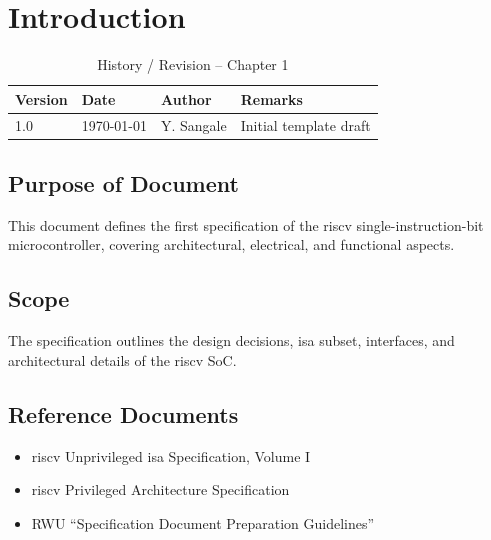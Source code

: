 
\chapter{Introduction}
\label{chap:introduction}

\begin{table}[H]
\caption{History / Revision – Chapter 1}
\label{tab:history-ch1}
\centering
\begin{tabular}{llll}
\toprule
Version & Date & Author & Remarks \\
\midrule
1.0 & \today & Y. Sangale & Initial template draft \\
\bottomrule
\end{tabular}
\end{table}

\section{Purpose of Document}
This document defines the first specification of the \gls{riscv} single-instruction-bit microcontroller, covering architectural, electrical, and functional aspects.

\section{Scope}
The specification outlines the design decisions, \gls{isa} subset, interfaces, and architectural details of the \gls{riscv} \gls{SoC}.

\section{Reference Documents}
\begin{itemize}
    \item \gls{riscv} Unprivileged \gls{isa} Specification, Volume I
    \item \gls{riscv} Privileged Architecture Specification
    \item RWU “Specification Document Preparation Guidelines”
\end{itemize}

